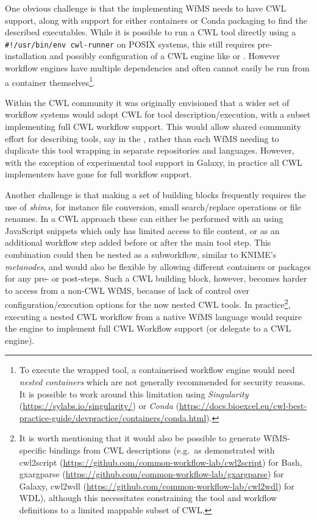 One obvious challenge is that the implementing WfMS needs to have CWL support, along with support for either containers or Conda packaging to find the described executables.
While it is possible to run a CWL tool directly using a \texttt{\#!/usr/bin/env\ cwl-runner}  on POSIX systems, this still requires pre-installation and possibly configuration of a CWL engine like  or  \cite{Vivian 2017}.
However workflow engines have multiple dependencies and often cannot easily be run from a container themselves\footnote{To execute the wrapped tool, a containerised workflow engine would need \emph{nested containers} which are not generally recommended for security reasons.
It is possible to work around this limitation using \emph{Singularity} (\url{https://sylabs.io/singularity/}) or \emph{Conda} (\url{https://docs.bioexcel.eu/cwl-best-practice-guide/devpractice/containers/conda.html}).}.

Within the CWL community it was originally envisioned that a wider set of workflow systems would adopt CWL for tool description/execution, with a subset implementing full CWL workflow support.
This would allow shared community effort for describing tools, say in the , rather than each WfMS needing to duplicate this tool wrapping in separate repositories and languages.
However, with the exception of experimental tool support in Galaxy, in practice all CWL implementers have gone for full workflow support.

Another challenge is that making a set of building blocks frequently requires the use of \emph{shims}, for instance file conversion, small search/replace operations or file renames.
In a CWL approach these can either be performed with an  using JavaScript snippets which only has limited access to file content, or as an additional workflow step added before or after the main tool step.
This combination could then be nested as a subworkflow, similar to KNIME's \emph{metanodes}, and would also be flexible by allowing different containers or packages for any pre- or post-steps.
Such a CWL building block, however, becomes harder to access from a non-CWL WfMS, because of lack of control over configuration/execution options for the
now nested CWL tools.
In practice\footnote{It is worth mentioning that it would also be possible to generate WfMS-specific bindings from CWL descriptions 
(e.g.~as demonstrated with 
cwl2script (\url{https://github.com/common-workflow-lab/cwl2script}) for Bash, 
gxargparse (\url{https://github.com/common-workflow-lab/gxargparse}) for Galaxy, 
cwl2wdl (\url{https://github.com/common-workflow-lab/cwl2wdl}) for WDL), 
although this necessitates constraining the tool and workflow definitions to a limited mappable subset of CWL.}, executing a nested CWL workflow from a native WfMS language would require the engine to implement full CWL Workflow support (or delegate to a CWL engine).


